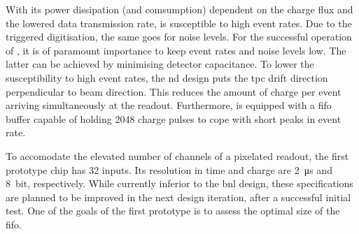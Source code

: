 With its power dissipation (and comsumption) dependent on the charge flux and the lowered data transmission rate, \larpix{} is susceptible to high event rates.
Due to the triggered digitisation, the same goes for noise levels.
For the successful operation of \larpix{}, it is of paramount importance to keep event rates and noise levels low.
The latter can be achieved by minimising detector capacitance.
To lower the susceptibility to high event rates, the \dune{} \gls{nd} design puts the \gls{tpc} drift direction perpendicular to beam direction.
This reduces the amount of charge per event arriving simultaneously at the readout.
Furthermore, \larpix{} is equipped with a \gls{fifo} buffer capable of holding \num{2048} charge pulses to cope with short peaks in event rate.

To accomodate the elevated number of channels of a pixelated readout, the first \larpix{} prototype chip has \num{32} inputs.
Its resolution in time and charge are \SI{2}{\micro\second} and \SI{8}{bit}, respectively.
While currently inferior to the \gls{bnl} design, these specifications are planned to be improved in the next design iteration, after a successful initial test.
One of the goals of the first prototype is to assess the optimal size of the \gls{fifo}.~\cite{danLarpix}
